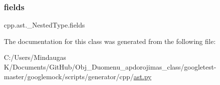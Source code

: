 \subsubsection{\texorpdfstring{fields}{fields}}
{\footnotesize\ttfamily cpp.\+ast.\+\_\+\+Nested\+Type.\+fields}



The documentation for this class was generated from the following file\+:\begin{DoxyCompactItemize}
\item 
C\+:/\+Users/\+Mindaugas K/\+Documents/\+Git\+Hub/\+Obj\+\_\+\+Duomenu\+\_\+apdorojimas\+\_\+class/googletest-\/master/googlemock/scripts/generator/cpp/\mbox{\hyperlink{googletest-master_2googlemock_2scripts_2generator_2cpp_2ast_8py}{ast.\+py}}\end{DoxyCompactItemize}
